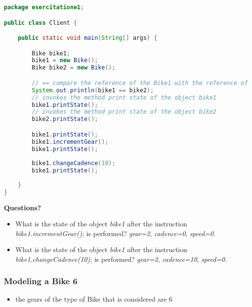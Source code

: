 \documentclass{article}
\theoremstyle{definition}
\begin{document}
\begin{lstlisting}[language=Java,escapechar=|]
package esercitatione1;

public class Client {

	public static void main(String[] args) {

		Bike bike1;
		bike1 = new Bike();
		Bike bike2 = new Bike();

		// == compare the reference of the Bike1 with the reference of the Bike2
		System.out.println(bike1 == bike2);
		// invokes the method print state of the object bike1
		bike1.printState();
		// invokes the method print state of the object bike2
		bike2.printState();

		bike1.printState();
		bike1.incrementGear();
		bike1.printState();
		
		bike1.changeCadence(10);
		bike1.printState();
		
	}
}
\end{lstlisting}

\textbf{Questions?}\\
\begin{itemize}
\item What is  the state of the object \emph{bike1} after the instruction  \emph{bike1.incrementGear();} is performed? 
\emph{gear=2}, \emph{cadence=0}, \emph{speed=0}.
\item What is  the state of the object \emph{bike1} after the instruction  \emph{bike1.changeCadence(10);} is performed? 
\emph{gear=2}, \emph{cadence=10}, \emph{speed=0}.
\end{itemize}

\subsubsection{Modeling a Bike 6}
\begin{itemize}
\item the gears of the type of Bike that is considered are $6$ 
\end{itemize}
\end{document}
